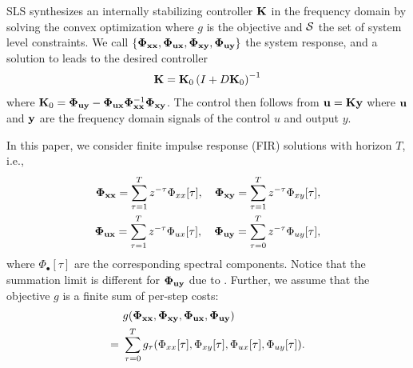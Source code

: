 SLS synthesizes an internally stabilizing controller ${\bf K}$ in the frequency domain by solving the convex optimization
where $g$ is the objective and $\mathcal{S}$ the set of system level constraints.
We call $\{\bm{\Phi}_{{\bf x}{\bf x}}, \bm{\Phi}_{{\bf u}{\bf x}}, \bm{\Phi}_{{\bf x}{\bf y}}, \bm{\Phi}_{{\bf u}{\bf y}}\}$ the system response, and a solution to  leads to the desired controller \cite[Corollary 5]{tseng2021realization}
\begin{align*}
{\bf K} = {\bf K}_0 \left( I + D{\bf K}_0 \right)^{-1}
\end{align*}
where ${\bf K}_0 = \bm{\Phi}_{{\bf u}{\bf y}} - \bm{\Phi}_{{\bf u}{\bf x}} \bm{\Phi}_{{\bf x}{\bf x}}^{-1} \bm{\Phi}_{{\bf x}{\bf y}}$.
The control then follows from ${\bf u} = {\bf K} {\bf y}$ where ${\bf u}$ and ${\bf y}$ are the frequency domain signals of the control $u$ and output $y$.

In this paper, we consider finite impulse response (FIR) solutions with horizon $T$, i.e.,
\begin{align*}
\bm{\Phi}_{{\bf x}{\bf x}} = \sum\limits_{\tau = 1}^T z^{-\tau} \Phi_{xx}[\tau], \quad
\bm{\Phi}_{{\bf x}{\bf y}} = \sum\limits_{\tau = 1}^T z^{-\tau} \Phi_{xy}[\tau], \\
\bm{\Phi}_{{\bf u}{\bf x}} = \sum\limits_{\tau = 1}^T z^{-\tau} \Phi_{ux}[\tau], \quad
\bm{\Phi}_{{\bf u}{\bf y}} = \sum\limits_{\tau = 0}^T z^{-\tau} \Phi_{uy}[\tau],
\end{align*}
where $\Phi_{\bullet}[\tau]$ are the corresponding spectral components.
Notice that the summation limit is different for $\bm{\Phi}_{{\bf u}{\bf y}}$ due to . Further, we assume that the objective $g$ is a finite sum of per-step costs:
\begin{align*}
&\ g(\bm{\Phi}_{{\bf x}{\bf x}},\bm{\Phi}_{{\bf x}{\bf y}},\bm{\Phi}_{{\bf u}{\bf x}},\bm{\Phi}_{{\bf u}{\bf y}})\\
=&\ \sum\limits_{\tau = 0}^{T} g_{\tau}(\Phi_{xx}[\tau],\Phi_{xy}[\tau],\Phi_{ux}[\tau],\Phi_{uy}[\tau]).
\end{align*}


